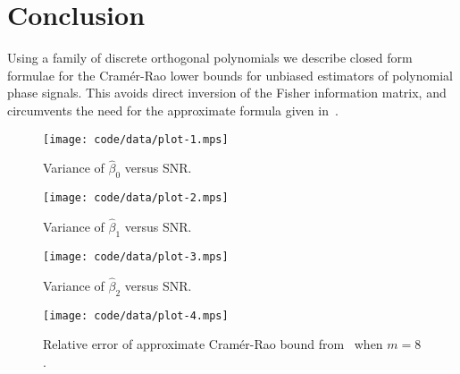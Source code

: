 \documentclass[review]{elsarticle}
\begin{document}
 
\section{Conclusion}

Using a family of discrete orthogonal polynomials we describe closed form formulae for the Cram\'{e}r-Rao lower bounds for unbiased estimators of polynomial phase signals.  This avoids direct inversion of the Fisher information matrix, and circumvents the need for the approximate formula given in~\cite{Peleg1991_CRB_PPS_1991}.


{

\small

}




 \begin{figure}[p]
    	\centering 
   		\texttt{[image: code/data/plot-1.mps]} 
    		\caption{Variance of $\hat{\beta}_0$ versus SNR.} 
    		\label{plot:phase0} 
 \end{figure} 

\clearpage

 \begin{figure}[p]
    	\centering 
   		\texttt{[image: code/data/plot-2.mps]} 
    		\caption{Variance of $\hat{\beta}_1$ versus SNR.} 
    		\label{plot:phase1} 
 \end{figure} 

\clearpage

 \begin{figure}[p]
    	\centering 
   		\texttt{[image: code/data/plot-3.mps]} 
    		\caption{Variance of $\hat{\beta}_2$ versus SNR.} 
    		\label{plot:phase2} 
 \end{figure}  
 
\clearpage

 \begin{figure}[p]
    	\centering 
   		\texttt{[image: code/data/plot-4.mps]} 
    		\caption{Relative error of approximate Cram\'{e}r-Rao bound from~\cite{Peleg1991_CRB_PPS_1991} when $m=8$.} 
    		\label{plot:relerror} 
 \end{figure}
\end{document}
